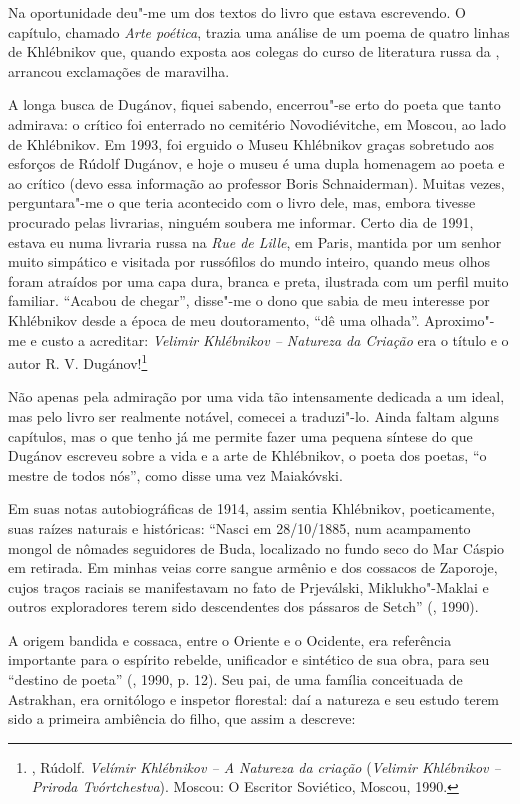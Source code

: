 Na oportunidade deu"-me um dos textos do livro que estava escrevendo. O
capítulo, chamado \emph{Arte poética}, trazia uma análise de um poema
de quatro linhas de Khlébnikov que, quando exposta aos colegas do curso
de literatura russa da , arrancou exclamações de maravilha.

A longa busca de Dugánov, fiquei sabendo, encerrou"-se erto do poeta que
tanto admirava: o crítico foi enterrado no cemitério Novodiévitche, em
Moscou, ao lado de Khlébnikov. Em 1993, foi erguido o Museu
Khlébnikov graças sobretudo aos esforços de Rúdolf Dugánov, e hoje o museu é uma
dupla homenagem ao poeta e ao crítico (devo
essa informação ao professor Boris Schnaiderman). Muitas vezes,
perguntara"-me o que teria acontecido com o livro dele, mas, embora
tivesse procurado pelas livrarias, ninguém soubera me informar. Certo
dia de 1991, estava eu numa livraria russa na \emph{Rue de Lille}, em Paris,
mantida por um senhor muito simpático e
visitada por russófilos do mundo inteiro, quando meus olhos foram
atraídos por uma capa dura, branca e preta, ilustrada com um perfil muito
familiar. ``Acabou de chegar'', disse"-me o dono que sabia de meu
interesse por Khlébnikov desde a época de meu doutoramento, ``dê uma
olhada''. Aproximo"-me e custo a acreditar: \emph{Velimir Khlébnikov -- Natureza da Criação} era o título e o autor R. V.
Dugánov!\footnote{, Rúdolf. \emph{Velímir Khlébnikov -- A
Natureza da criação} (\emph{Velimir Khlébnikov -- Priroda
Tvórtchestva}). Moscou: O Escritor Soviético, Moscou, 1990.}

Não apenas pela admiração por uma vida tão intensamente dedicada a um
ideal, mas pelo livro ser realmente notável, comecei a traduzi"-lo.
Ainda faltam alguns capítulos, mas o que tenho já me
permite fazer uma pequena síntese do que Dugánov escreveu sobre a
vida e a arte de Khlébnikov, o poeta dos poetas, ``o mestre de
todos nós'', como disse uma vez Maiakóvski.

Em suas notas autobiográficas de 1914, assim sentia Khlébnikov,
poeticamente, suas raízes naturais e históricas: ``Nasci em 28/10/1885,
num acampamento mongol de nômades seguidores de Buda, localizado no
fundo seco do Mar Cáspio em retirada. Em minhas veias corre sangue
armênio e dos cossacos de Zaporoje, cujos traços raciais se manifestavam
no fato de Prjeválski, Miklukho"-Maklai e outros exploradores terem sido
descendentes dos pássaros de Setch'' (, 1990).

A origem bandida e cossaca, entre o Oriente e o Ocidente,
era referência importante para o espírito rebelde, unificador e
sintético de sua obra, para seu ``destino de poeta'' (, 1990, p. 12). Seu pai, de uma
família conceituada de Astrakhan, era ornitólogo e inspetor florestal:
daí a natureza e seu estudo terem sido a primeira ambiência do filho,
que assim a descreve:

